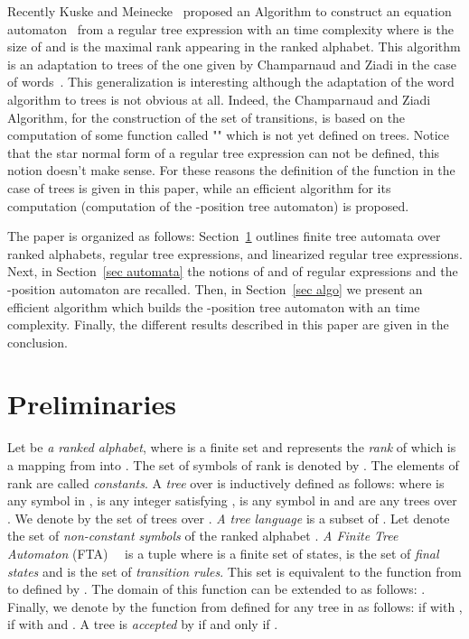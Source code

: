 \documentclass{llncs}
\begin{document}
Recently Kuske and Meinecke~\cite{automate2} proposed an Algorithm to construct an equation automaton~\cite{antimirov,ouardi} from a regular tree expression    with an  time complexity where  is the size of  and  is the maximal rank appearing in the ranked alphabet. 
This algorithm is an adaptation to trees of the one given by Champarnaud and Ziadi in the case of words~\cite{ZPC}. 
This generalization is interesting although the adaptation of the word algorithm to trees is not obvious at all.
Indeed, the Champarnaud and Ziadi Algorithm, for the construction of the set of transitions, is based 
on the computation of some function called "" which is not yet defined on trees.  
Notice that the star normal form of a regular tree expression  can not be defined, this notion doesn't make sense.  
For these reasons the definition of the  function in the case of trees is given in this paper, while an efficient algorithm for its computation (computation of the -position tree automaton) is proposed. 

The paper is organized as follows: Section~\ref{sec prelim} outlines finite tree automata over ranked alphabets, regular tree expressions, and linearized regular tree expressions. Next, in Section~\ref{sec automata} the notions of  and  of regular expressions and the -position automaton are recalled. Then, in Section~\ref{sec algo} we present an efficient algorithm which builds the -position tree automaton with an  time complexity. Finally, the different results described in this paper are given in the conclusion. 

\section{Preliminaries}\label{sec prelim}
    Let  be  \emph{a ranked alphabet}, where  is a finite set and  represents the  \emph{rank} of  which is a mapping from  into . The set of symbols of rank  is denoted by . The elements of rank  are called  \emph{constants}. A \emph{tree}  over    is inductively defined as follows:  where  is any symbol in  ,  is any integer satisfying ,  is any symbol in  and  are any  trees over . We denote by  the set of trees over .  \emph{A tree language} is a subset of . Let  denote the set of  \emph{non-constant symbols} of the ranked alphabet . \emph{A Finite Tree Automaton} (FTA)~~\cite{automate1,automate2}  is a tuple  where  is a finite set of states,  is the set of \emph{final states} 
and   is the set of  \emph{transition rules}. This set is equivalent to the function  from  to  defined  by . The domain of this function can be extended to 
as follows: .  Finally, we denote by  the function from    defined for any tree in  as follows: 
   if   with , 
   if  with  and . 
  A tree is \emph{accepted} by  if and only if .   
 
\end{document}
